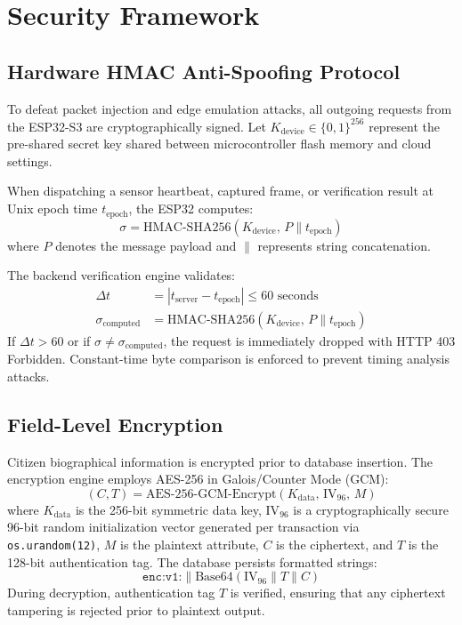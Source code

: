 \documentclass[11pt,a4paper]{article}
\begin{document}
\section{Security Framework}

\subsection{Hardware HMAC Anti-Spoofing Protocol}
To defeat packet injection and edge emulation attacks, all outgoing requests from the ESP32-S3 are cryptographically signed. Let $K_{\text{device}} \in \{0, 1\}^{256}$ represent the pre-shared secret key shared between microcontroller flash memory and cloud settings.

When dispatching a sensor heartbeat, captured frame, or verification result at Unix epoch time $t_{\text{epoch}}$, the ESP32 computes:
\begin{equation}
\sigma = \text{HMAC-SHA256}\left( K_{\text{device}}, \, P \parallel t_{\text{epoch}} \right)
\label{eq:hmac}
\end{equation}
where $P$ denotes the message payload and $\parallel$ represents string concatenation.

The backend verification engine validates:
\begin{align}
\Delta t &= |t_{\text{server}} - t_{\text{epoch}}| \le 60\text{ seconds} \label{eq:freshness} \\
\sigma_{\text{computed}} &= \text{HMAC-SHA256}\left( K_{\text{device}}, \, P \parallel t_{\text{epoch}} \right) \label{eq:verify_hmac}
\end{align}
If $\Delta t > 60$ or if $\sigma \ne \sigma_{\text{computed}}$, the request is immediately dropped with HTTP 403 Forbidden. Constant-time byte comparison is enforced to prevent timing analysis attacks.

\subsection{Field-Level Encryption}
Citizen biographical information is encrypted prior to database insertion. The encryption engine employs AES-256 in Galois/Counter Mode (GCM):
\begin{equation}
(C, T) = \text{AES-256-GCM-Encrypt}\left(K_{\text{data}}, \, \text{IV}_{96}, \, M\right)
\label{eq:aes}
\end{equation}
where $K_{\text{data}}$ is the 256-bit symmetric data key, $\text{IV}_{96}$ is a cryptographically secure 96-bit random initialization vector generated per transaction via \texttt{os.urandom(12)}, $M$ is the plaintext attribute, $C$ is the ciphertext, and $T$ is the 128-bit authentication tag. The database persists formatted strings:
\begin{equation}
\texttt{enc:v1:} \parallel \text{Base64}\left( \text{IV}_{96} \parallel T \parallel C \right)
\end{equation}
During decryption, authentication tag $T$ is verified, ensuring that any ciphertext tampering is rejected prior to plaintext output.
\end{document}
